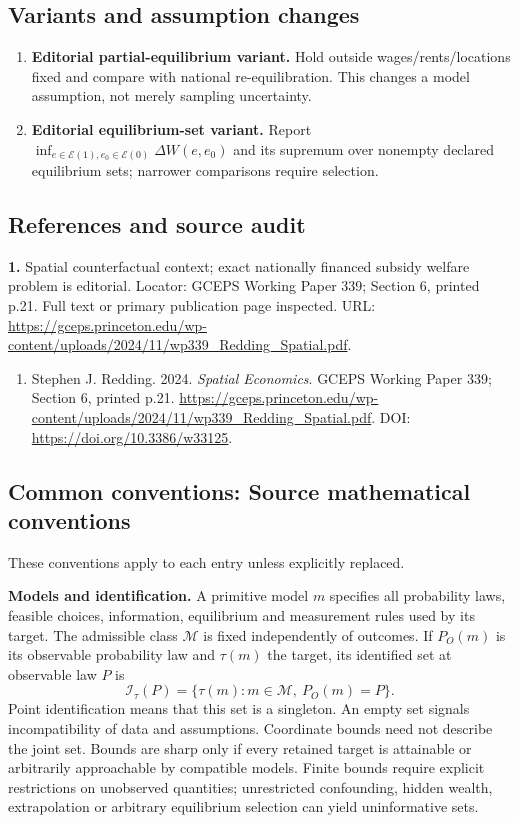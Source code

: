 \documentclass[11pt,a4paper]{article}
\begin{document}
\subsection*{Variants and assumption changes}
\begin{enumerate}
\item \textbf{Editorial partial-equilibrium variant.} Hold outside wages/rents/locations fixed and compare with national re-equilibration. This changes a model assumption, not merely sampling uncertainty.
\item \textbf{Editorial equilibrium-set variant.} Report \(\inf_{e\in\mathcal E(1),e_0\in\mathcal E(0)}\Delta W(e,e_0)\) and its supremum over nonempty declared equilibrium sets; narrower comparisons require selection.
\end{enumerate}
\subsection*{References and source audit}
\textbf{1.} Spatial counterfactual context; exact nationally financed subsidy welfare problem is editorial. Locator: GCEPS Working Paper 339; Section 6, printed p.21. Full text or primary publication page inspected. URL: \url{https://gceps.princeton.edu/wp-content/uploads/2024/11/wp339_Redding_Spatial.pdf}.
\begin{enumerate}\raggedright
\item\hypertarget{definitions:source:30007749:1}{} Stephen J. Redding. 2024. \emph{Spatial Economics}. GCEPS Working Paper 339; Section 6, printed p.21.
\url{https://gceps.princeton.edu/wp-content/uploads/2024/11/wp339_Redding_Spatial.pdf}.
DOI: \url{https://doi.org/10.3386/w33125}.
\end{enumerate}

\subsection*{Common conventions: Source mathematical conventions}

These conventions apply to each entry unless explicitly replaced.

\textbf{Models and identification.} A primitive model \(m\) specifies all probability laws, feasible choices, information, equilibrium and measurement rules used by its target. The admissible class \(\mathcal M\) is fixed independently of outcomes. If \(P_O(m)\) is its observable probability law and \(\tau(m)\) the target, its identified set at observable law \(P\) is
\[
 \mathcal I_\tau(P)=\{\tau(m):m\in\mathcal M,\ P_O(m)=P\}.
\]
Point identification means that this set is a singleton. An empty set signals incompatibility of data and assumptions. Coordinate bounds need not describe the joint set. Bounds are sharp only if every retained target is attainable or arbitrarily approachable by compatible models. Finite bounds require explicit restrictions on unobserved quantities; unrestricted confounding, hidden wealth, extrapolation or arbitrary equilibrium selection can yield uninformative sets.
\end{document}
